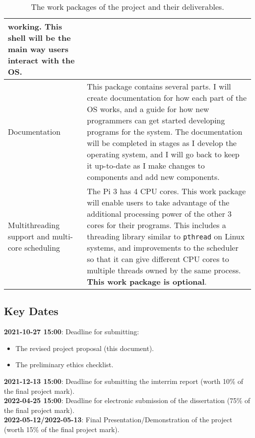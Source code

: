 \documentclass{article}
\begin{document}
\begin{table}[tbp]
\begin{center}
\begin{tabular}{|p{45mm}|p{125mm}|}
    working. This shell will be the main way users interact with the OS.
    \\ \hline
    Documentation &
    This package contains several parts. I will create documentation for how
    each part of the OS works, and a guide for how new programmers can get
    started developing programs for the system. The documentation will be
    completed in stages as I develop the operating system, and I will go back
    to keep it up-to-date as I make changes to components and add new
    components.
    \\ \hline
    Multithreading support and multi-core scheduling &
    The Pi 3 has 4 CPU cores. This work package will enable users to take
    advantage of the additional processing power of the other 3 cores for their
    programs. This includes a threading library similar to \texttt{pthread} on
    Linux systems, and improvements to the scheduler so that it can give
    different CPU cores to multiple threads owned by the same process.
    \textbf{This work package is optional}.
    \\ \hline
\end{tabular}
\caption{The work packages of the project and their deliverables.}
\label{tab:work-packages}
\end{center}
\end{table}

\subsection*{Key Dates}
\textbf{2021-10-27 15:00}: Deadline for submitting:
\begin{itemize}
    \item The revised project proposal (this document).
    \item The preliminary ethics checklist.
\end{itemize}
\textbf{2021-12-13 15:00}: Deadline for submitting the imterrim report (worth
10\% of the final project mark).\\
\textbf{2022-04-25 15:00}: Deadline for electronic submission of the
dissertation (75\% of the final project mark).\\
\textbf{2022-05-12/2022-05-13}: Final Presentation/Demonstration of the project
(worth 15\% of the final project mark).



\nocite{design-of-unix-os}
\nocite{osdev-wiki}
\nocite{unix-prog-env}
\printbibliography
\end{document}
